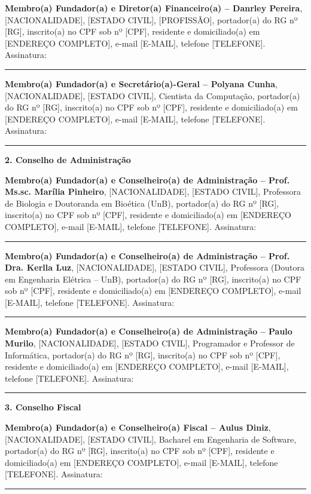 \documentclass[11pt,a4paper]{article}
\begin{document}
\textbf{Membro(a) Fundador(a) e Diretor(a) Financeiro(a) -- Danrley Pereira}, [NACIONALIDADE], [ESTADO CIVIL], [PROFISSÃO], portador(a) do RG nº [RG], inscrito(a) no CPF sob nº [CPF], residente e domiciliado(a) em [ENDEREÇO COMPLETO], e-mail [E-MAIL], telefone [TELEFONE]. Assinatura: \rule{6cm}{0.4pt}

\vspace{1em}

\textbf{Membro(a) Fundador(a) e Secretário(a)-Geral -- Polyana Cunha}, [NACIONALIDADE], [ESTADO CIVIL], Cientista da Computação, portador(a) do RG nº [RG], inscrito(a) no CPF sob nº [CPF], residente e domiciliado(a) em [ENDEREÇO COMPLETO], e-mail [E-MAIL], telefone [TELEFONE]. Assinatura: \rule{6cm}{0.4pt}

\textbf{2. Conselho de Administração}

\textbf{Membro(a) Fundador(a) e Conselheiro(a) de Administração -- Prof. Ms.sc. Marília Pinheiro}, [NACIONALIDADE], [ESTADO CIVIL], Professora de Biologia e Doutoranda em Bioética (UnB), portador(a) do RG nº [RG], inscrito(a) no CPF sob nº [CPF], residente e domiciliado(a) em [ENDEREÇO COMPLETO], e-mail [E-MAIL], telefone [TELEFONE]. Assinatura: \rule{6cm}{0.4pt}

\vspace{1em}

\textbf{Membro(a) Fundador(a) e Conselheiro(a) de Administração -- Prof. Dra. Kerlla Luz}, [NACIONALIDADE], [ESTADO CIVIL], Professora (Doutora em Engenharia Elétrica -- UnB), portador(a) do RG nº [RG], inscrito(a) no CPF sob nº [CPF], residente e domiciliado(a) em [ENDEREÇO COMPLETO], e-mail [E-MAIL], telefone [TELEFONE]. Assinatura: \rule{6cm}{0.4pt}

\vspace{1em}

\textbf{Membro(a) Fundador(a) e Conselheiro(a) de Administração -- Paulo Murilo}, [NACIONALIDADE], [ESTADO CIVIL], Programador e Professor de Informática, portador(a) do RG nº [RG], inscrito(a) no CPF sob nº [CPF], residente e domiciliado(a) em [ENDEREÇO COMPLETO], e-mail [E-MAIL], telefone [TELEFONE]. Assinatura: \rule{6cm}{0.4pt}

\textbf{3. Conselho Fiscal}

\textbf{Membro(a) Fundador(a) e Conselheiro(a) Fiscal -- Aulus Diniz}, [NACIONALIDADE], [ESTADO CIVIL], Bacharel em Engenharia de Software, portador(a) do RG nº [RG], inscrito(a) no CPF sob nº [CPF], residente e domiciliado(a) em [ENDEREÇO COMPLETO], e-mail [E-MAIL], telefone [TELEFONE]. Assinatura: \rule{6cm}{0.4pt}
\end{document}
